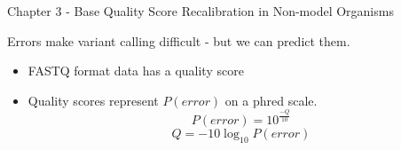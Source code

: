 \documentclass{beamer}
\begin{document}
\begin{frame}{Chapter 3 - Base Quality Score Recalibration in Non-model Organisms}

Errors make variant calling difficult - but we can predict them.

\begin{itemize}
	\item FASTQ format data has a quality score
	\item Quality scores represent $P(error)$ on a phred scale.
	\begin{displaymath}
	P(error) = 10^{\frac{-Q}{10}}
	\end{displaymath}
	\begin{displaymath}
	Q = -10\log_{10}{P(error)}
	\end{displaymath}
\end{itemize}

\end{frame}
\end{document}
